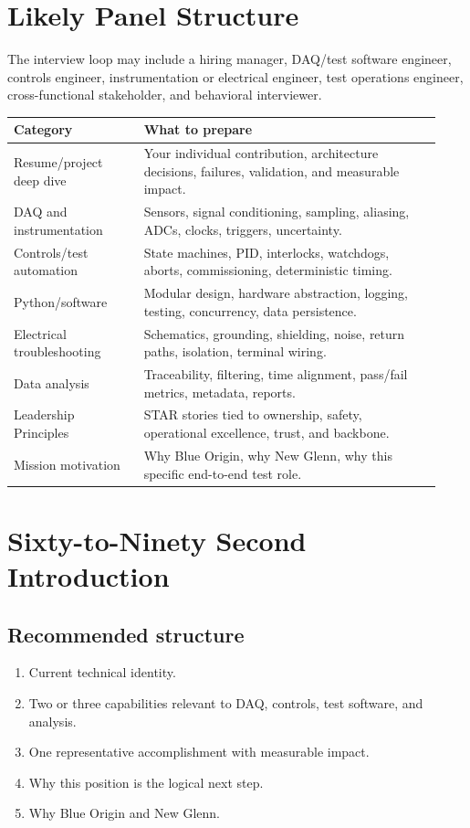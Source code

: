 \documentclass[11pt]{article}
\begin{document}
\section{Likely Panel Structure}

The interview loop may include a hiring manager, DAQ/test software engineer,
controls engineer, instrumentation or electrical engineer, test operations
engineer, cross-functional stakeholder, and behavioral interviewer.

\begin{longtable}{p{0.29\linewidth}p{0.64\linewidth}}
\toprule
\textbf{Category} & \textbf{What to prepare} \\
\midrule
Resume/project deep dive & Your individual contribution, architecture decisions, failures, validation, and measurable impact. \\
DAQ and instrumentation & Sensors, signal conditioning, sampling, aliasing, ADCs, clocks, triggers, uncertainty. \\
Controls/test automation & State machines, PID, interlocks, watchdogs, aborts, commissioning, deterministic timing. \\
Python/software & Modular design, hardware abstraction, logging, testing, concurrency, data persistence. \\
Electrical troubleshooting & Schematics, grounding, shielding, noise, return paths, isolation, terminal wiring. \\
Data analysis & Traceability, filtering, time alignment, pass/fail metrics, metadata, reports. \\
Leadership Principles & STAR stories tied to ownership, safety, operational excellence, trust, and backbone. \\
Mission motivation & Why Blue Origin, why New Glenn, why this specific end-to-end test role. \\
\bottomrule
\end{longtable}

\section{Sixty-to-Ninety Second Introduction}

\subsection{Recommended structure}
\begin{enumerate}
  \item Current technical identity.
  \item Two or three capabilities relevant to DAQ, controls, test software, and analysis.
  \item One representative accomplishment with measurable impact.
  \item Why this position is the logical next step.
  \item Why Blue Origin and New Glenn.
\end{enumerate}
\end{document}
